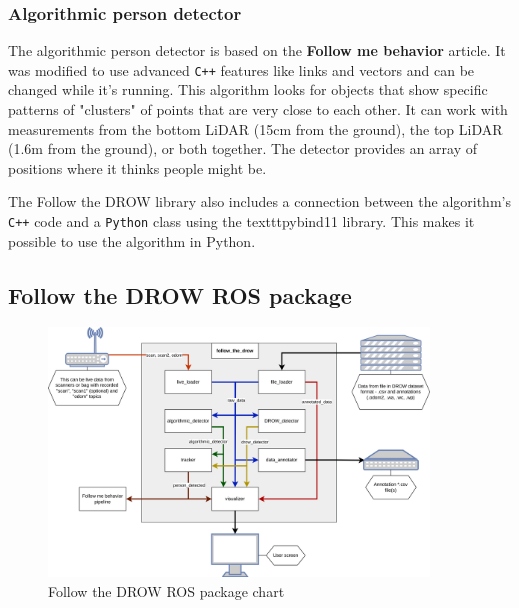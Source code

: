 \documentclass{article}
\begin{document}
\subsubsection{Algorithmic person detector}

The algorithmic person detector is based on the \textbf{Follow me behavior} article\cite{follow_me_behavior}.
It was modified to use advanced \texttt{C++} features like links and vectors and can be changed while it's running.
This algorithm looks for objects that show specific patterns of "clusters" of points that are very close to each other.
It can work with measurements from the bottom LiDAR (15cm from the ground), the top LiDAR (1.6m from the ground), or both together.
The detector provides an array of positions where it thinks people might be.

The Follow the DROW library also includes a connection between the algorithm's \texttt{C++} code and a \texttt{Python} class using the texttt{pybind11}\cite{pybind_site} library.
This makes it possible to use the algorithm in Python.

\subsection{Follow the DROW ROS package}

\begin{figure}[t!]
	\centering
	\includegraphics[width=0.9\textwidth]{ftd_package_chart}
	\caption{Follow the DROW ROS package chart}
	\label{fig:ftd_package_chart}
\end{figure}
\end{document}

